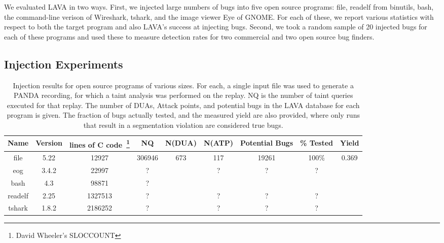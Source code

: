 
\label{section:results}

We evaluated LAVA in two ways.
First, we injected large numbers of bugs into five open source programs: file, readelf from binutils, bash, the command-line verison of Wireshark, tshark, and the image viewer Eye of GNOME.
For each of these, we report various statistics with respect to both the target program and also LAVA's success at injecting bugs. 
Second, we took a random sample of 20 injected bugs for each of these programs and used these to measure detection rates for two commercial and two open source bug finders.

\subsection{Injection Experiments}


\begin{table*}[t]
\centering
\begin{tabular}{c|c|c|c|c|c|c|c|c} 
Name    & Version & lines of C code~\footnote{David Wheeler's SLOCCOUNT} & NQ      &  N(DUA) & N(ATP) & Potential Bugs & \% Tested & Yield \\ \hline
file    & 5.22    & 12927           & 306946  & 673     & 117    & 19261          & 100\%     & 0.369  \\
eog     & 3.4.2   & 22997           & ?       &         & ?      & ?              & ?         &  \\
bash    & 4.3     & 98871           & ?       &         &        &                &           &  \\
readelf & 2.25    & 1327513         & ?       &         & ?      & ?              & ?         &  \\
tshark  & 1.8.2   & 2186252         & ?       &         & ?      & ?              & ?         &  \\
\end{tabular}
\caption{Injection results for open source programs of various sizes.
For each, a single input file was used to generate a PANDA recording, for which a taint analysis was performed on the replay.
NQ is the number of taint queries executed for that replay.
The number of DUAs, Attack points, and potential bugs in the LAVA database for each program is given.
The fraction of bugs actually tested, and the measured yield are also provided, where only runs that result in a segmentation violation are considered true bugs.
}
\end{table*}


